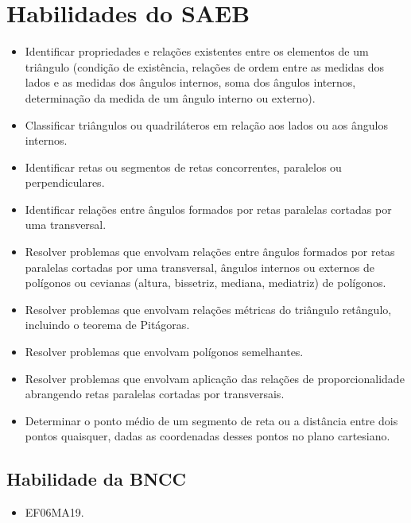 \section*{Habilidades do SAEB} 
\begin{itemize}
\item Identificar propriedades e relações existentes
entre os elementos de um triângulo (condição de existência, relações de
ordem entre as medidas dos lados e as medidas dos ângulos internos, soma
dos ângulos internos, determinação da medida de um ângulo interno ou
externo).
\item
  Classificar triângulos ou quadriláteros em relação aos lados ou aos
  ângulos internos.
\item
  Identificar retas ou segmentos de retas concorrentes, paralelos ou
  perpendiculares.
\item
  Identificar relações entre ângulos formados por retas paralelas
  cortadas por uma transversal.
\item
  Resolver problemas que envolvam relações entre ângulos formados por
  retas paralelas cortadas por uma transversal, ângulos internos ou
  externos de polígonos ou cevianas (altura, bissetriz, mediana,
  mediatriz) de polígonos.
\item
  Resolver problemas que envolvam relações métricas do triângulo
  retângulo, incluindo o teorema de Pitágoras.
\item
  Resolver problemas que envolvam polígonos semelhantes.
\item
  Resolver problemas que envolvam aplicação das relações de
  proporcionalidade abrangendo retas paralelas cortadas por
  transversais.
\item
  Determinar o ponto médio de um segmento de reta ou a distância entre
  dois pontos quaisquer, dadas as coordenadas desses pontos no plano
  cartesiano.
\end{itemize}

\subsection{Habilidade da BNCC} 

\begin{itemize}
\item EF06MA19.
\end{itemize}

